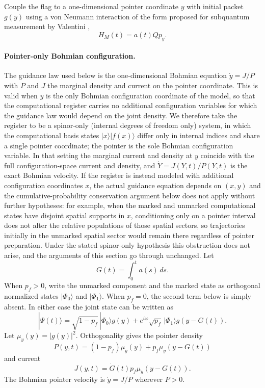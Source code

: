 \documentclass[pdflatex,sn-mathphys-num]{sn-jnl}
\theoremstyle{thmstyleone}
\begin{document}
Couple the flag to a one-dimensional pointer coordinate $y$ with initial packet $g(y)$ using a von Neumann interaction of the form proposed for subquantum measurement by Valentini \cite{Valentini2002,Valentini2025},
\begin{equation}
H_M(t)=a(t)Qp_y.
\label{eq:measurementH}
\end{equation}

\paragraph{Pointer-only Bohmian configuration.}
\label{par:spinoronly}
The guidance law used below is the one-dimensional Bohmian equation $\dot y=J/P$ with $P$ and $J$ the marginal density and current on the pointer coordinate. This is valid when $y$ is the only Bohmian configuration coordinate of the model, so that the computational register carries no additional configuration variables for which the guidance law would depend on the joint density. We therefore take the register to be a spinor-only (internal degrees of freedom only) system, in which the computational basis states $|x\rangle|f(x)\rangle$ differ only in internal indices and share a single pointer coordinate; the pointer is the sole Bohmian configuration variable. In that setting the marginal current and density at $y$ coincide with the full configuration-space current and density, and $\dot Y=J(Y,t)/P(Y,t)$ is the exact Bohmian velocity. If the register is instead modeled with additional configuration coordinates $x$, the actual guidance equation depends on $(x,y)$ and the cumulative-probability conservation argument below does not apply without further hypotheses: for example, when the marked and unmarked computational states have disjoint spatial supports in $x$, conditioning only on a pointer interval does not alter the relative populations of those spatial sectors, so trajectories initially in the unmarked spatial sector would remain there regardless of pointer preparation. Under the stated spinor-only hypothesis this obstruction does not arise, and the arguments of this section go through unchanged.
Let
\begin{equation}
G(t)=\int_0^t a(s)\,ds.
\end{equation}
When $p_f>0$, write the unmarked component and the marked state as orthogonal normalized states $|\Phi_0\rangle$ and $|\Phi_1\rangle$. When $p_f=0$, the second term below is simply absent. In either case the joint state can be written as
\begin{equation}
|\Psi(t)\rangle
=\sqrt{1-p_f}\,|\Phi_0\rangle g(y)
+e^{i\varphi}\sqrt{p_f}\,|\Phi_1\rangle g(y-G(t)).
\label{eq:pointerstate}
\end{equation}
Let $\mu_y(y)=|g(y)|^2$. Orthogonality gives the pointer density
\begin{equation}
P(y,t)=(1-p_f)\mu_y(y)+p_f\mu_y(y-G(t))
\end{equation}
and current
\begin{equation}
J(y,t)=\dot G(t)p_f\mu_y(y-G(t)).
\end{equation}
The Bohmian pointer velocity is $\dot y=J/P$ wherever $P>0$.
\end{document}
